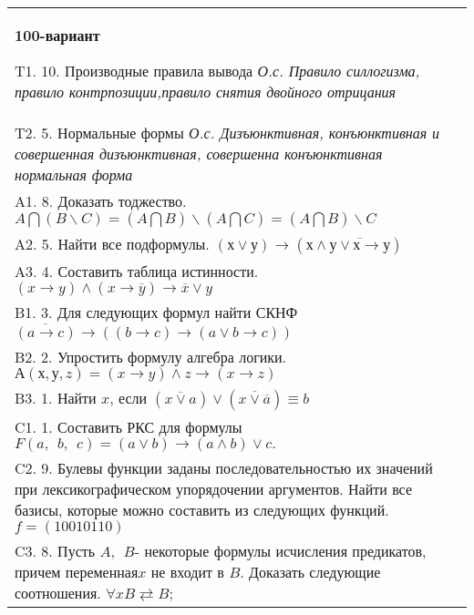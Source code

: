 \documentclass{article}
\begin{document}
\begin{tabular}{m{17cm}}
\textbf{100-вариант}
\newline

T1. 10. Производные правила вывода \emph{О.с. Правило силлогизма, правило контрпозиции,правило снятия двойного отрицания} \\
T2. 5. Нормальные формы \emph{О.с. Дизъюнктивная, конъюнктивная и совершенная дизъюнктивная, совершенна конъюнктивная нормальная форма} \\
A1. 8. Доказать тоджество. \(A\bigcap(B\backslash C) = (A\bigcap B)\backslash(A\bigcap C) = (A\bigcap B)\backslash C\) \\
A2. 5. Найти все подформулы. \((х \vee у) \rightarrow \left( х \land \overline{у \vee х \rightarrow у} \right)\) \\
A3. 4. Составить таблица истинности. \((x \rightarrow y) \land (x \rightarrow \overline{y}) \rightarrow \overline{x} \vee y\) \\
B1. 3. Для следующих формул найти СКНФ \(\overline{(a \rightarrow c)} \rightarrow \left( (b \rightarrow c) \rightarrow (a \vee b \rightarrow c) \right)\) \\
B2. 2. Упростить формулу алгебра логики. \(А(х,у,z) = (x \rightarrow y) \land z \rightarrow (x \rightarrow z)\) \\
B3. 1. Найти \(x\), если \(\left( \overline{x \vee a} \right) \vee \left( \overline{x \vee \overline{a}} \right) \equiv b\) \\
C1. 1. Составить РКС для формулы \(F(a,\ \ b,\ \ c) = (a \vee b) \rightarrow (a \land b) \vee c.\) \\
C2. 9. Булевы функции заданы последовательностью их значений при лексикографическом упорядочении аргументов. Найти все базисы, которые можно составить из следующих функций. \(f = (10010110)\) \\
C3. 8. Пусть \(A,\ \ B\)- некоторые формулы исчисления предикатов, причем переменная\(x\) не входит в \(B\). Доказать следующие соотношения. \(\forall xB \rightleftarrows B\); \\

\end{tabular}
\vspace{1cm}
\end{document}
